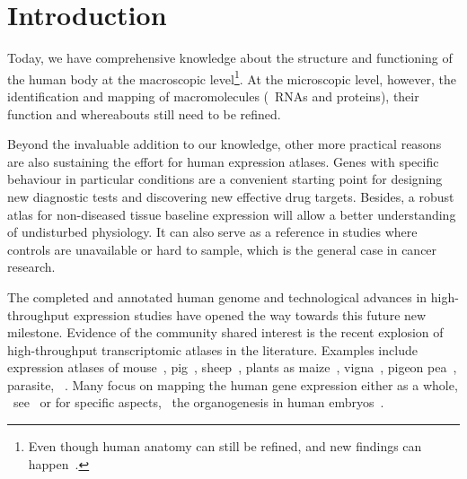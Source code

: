 \chapter*{Introduction}\label{ch:intro}

\setlength{\epigraphwidth}{0.62\textwidth}
\setlength{\epigraphrule}{0pt}

\vspace{-4mm}

Today, we have comprehensive knowledge %
about the structure and functioning of the human body
at the macroscopic level\footnote{%
Even though human anatomy can still be refined,
and new findings can happen~.}.
At the microscopic level, however,
the identification and mapping of macromolecules
(\ie\ \glspl{RNA} and proteins),
their function and whereabouts still need to be refined.\mybr\

Beyond the invaluable addition to our knowledge,
other more practical reasons are also sustaining the effort
for human expression atlases.
Genes with specific behaviour in particular conditions
are a convenient starting point
for designing new diagnostic tests
and discovering new effective drug targets.
Besides, a robust atlas for non-diseased tissue baseline expression
will allow a better understanding of undisturbed physiology.
It can also serve as a reference in studies where controls are unavailable
or hard to sample,
which is the general case in cancer research.\mybr\

The completed and annotated human genome and
technological advances in high-throughput expression studies
have opened the way towards this future new milestone.
Evidence of the community shared interest is
the recent explosion of high-throughput transcriptomic atlases in the literature.
Examples include expression atlases of
mouse~, pig~,
sheep~, plants as maize~,
vigna~, pigeon pea~,
parasite, \eg\ .
Many focus on mapping the human gene expression either as a whole,
\eg\ see~
or for specific aspects,
\eg\ the organogenesis in human embryos~.\mybr\

